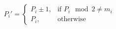 \documentclass{article}
\begin{document}
\[ P_i' = \begin{cases} P_i \pm 1, & \text{if } P_i \mod 2 \neq m_i \\ P_i, & \text{otherwise} \end{cases} \]
\pagebreak
\end{document}

